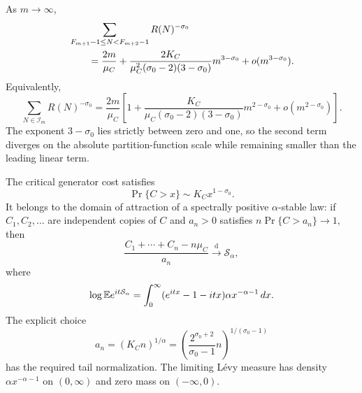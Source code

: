 \begin{theorem}
\label{cor:classical-fibonacci-critical-asymptotic}
As \(m\to\infty\),
\begin{align}
 &\sum_{F_{m+1}-1\le N<F_{m+2}-1}R(N)^{-\sigma_0}
 \notag\\
 &\qquad=\frac{2m}{\mu_C}
 +\frac{2K_C}{\mu_C^2(\sigma_0-2)(3-\sigma_0)}
  m^{3-\sigma_0}+o(m^{3-\sigma_0}).
 \label{eq:classical-fibonacci-critical-asymptotic}
\end{align}
Equivalently,
\begin{equation}
 \sum_{N\in\mathcal I_m}R(N)^{-\sigma_0}
 =\frac{2m}{\mu_C}\left[
 1+\frac{K_C}{\mu_C(\sigma_0-2)(3-\sigma_0)}
 m^{2-\sigma_0}+o(m^{2-\sigma_0})\right].
 \label{eq:relative-fibonacci-critical-correction}
\end{equation}
The exponent \(3-\sigma_0\) lies strictly between zero and one, so the
second term diverges on the absolute partition-function scale while
remaining smaller than the leading linear term.
\end{theorem}

\begin{corollary}
\label{cor:critical-cost-stable-domain}
The critical generator cost satisfies
\begin{equation}
 \Pr\{C>x\}\sim K_Cx^{1-\sigma_0}.
 \label{eq:critical-letter-tail}
\end{equation}
It belongs to the domain of attraction of a spectrally positive
\(\alpha\)-stable law: if \(C_1,C_2,\ldots\) are independent copies of
\(C\) and \(a_n>0\) satisfies \(n\Pr\{C>a_n\}\to1\), then
\begin{equation}
 \frac{C_1+\cdots+C_n-n\mu_C}{a_n}
 \xrightarrow{\mathrm d}\mathcal S_\alpha,
 \label{eq:critical-cost-stable-domain}
\end{equation}
where
\begin{equation}
 \log\mathbb{E} e^{it\mathcal S_\alpha}
 =\int_0^\infty
   (e^{itx}-1-itx)\alpha x^{-\alpha-1}\,dx.
 \label{eq:centered-stable-characteristic-exponent}
\end{equation}
The explicit choice
\begin{equation}
 a_n=(K_Cn)^{1/\alpha}
 =\left(\frac{2^{\sigma_0+2}}{\sigma_0-1}n\right)^{1/(\sigma_0-1)}
 \label{eq:explicit-critical-stable-normalization}
\end{equation}
has the required tail normalization.  The limiting L\'evy measure has
density \(\alpha x^{-\alpha-1}\) on \((0,\infty)\) and zero mass on
\(( -\infty,0)\).
\end{corollary}

